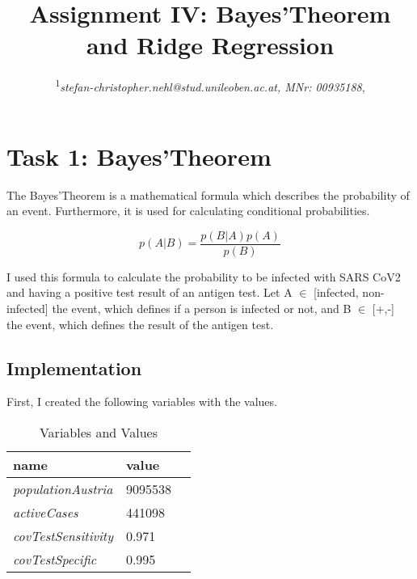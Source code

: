 \documentclass[10pt, a4paper, twocolumn]{article} %
\title{Assignment IV: Bayes'Theorem and Ridge Regression} %
\author{
	\coursetitle{Exercises in Machine Learning (190.013), SS2022}
	\authorstyle{Stefan Nehl\textsuperscript{1}} %
	\newline\newline %
	\textsuperscript{1}\textit{stefan-christopher.nehl@stud.unileoben.ac.at, MNr: 00935188}, \institution{Montanuniversität Leoben, Austria}\\ %
	\newline\submissiondate{\today} %
}
\begin{document}

\maketitle %

\thispagestyle{firstpage} %




\section{Task 1: Bayes'Theorem}
The Bayes'Theorem is a mathematical formula which describes the probability of an event. Furthermore, it is used for calculating conditional probabilities. \citep{bayesTheoremHist}

\[
p(A|B) = \frac{p(B|A)p(A)}{p(B)}
\]

\citep{bookMachineLearning}

I used this formula to calculate the probability to be infected with SARS CoV2 and having a positive test result of an antigen test. Let A $\in$ [infected, non-infected] the event, which defines if a person is infected or not, and B $\in$ [+,-] the event, which defines the result of the antigen test.

\subsection{Implementation}
First, I created the following variables with the values.

\begin{table}[htbp]
    \label{tab:alphaBetaParameters}
	\caption{Variables and Values}
	\centering
	\begin{tabular}{llr}
		\cmidrule(r){1-2}
		name & value \\
		\midrule
		\textit{populationAustria} & 9095538 \\
		\textit{activeCases} & 441098 \\
		\textit{covTestSensitivity} & 0.971 \\
		\textit{covTestSpecific} & 0.995 \\
		\bottomrule
	\end{tabular}
\end{table}
\end{document}
